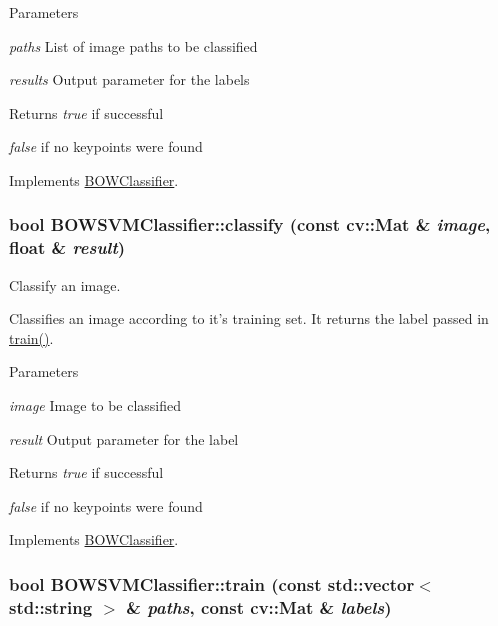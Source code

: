 \begin{DoxyParams}{Parameters}
\item[{\em paths}]List of image paths to be classified \item[{\em results}]Output parameter for the labels \end{DoxyParams}
\begin{DoxyReturn}{Returns}
{\itshape true\/} if successful\par
 {\itshape false\/} if no keypoints were found 
\end{DoxyReturn}


Implements \hyperlink{classBOWClassifier_a0785d39115372051816210d8d2c0335e}{BOWClassifier}.

\hypertarget{classBOWSVMClassifier_afe93005b018993deb266193ff942554a}{
\subsubsection[{classify}]{\setlength{\rightskip}{0pt plus 5cm}bool BOWSVMClassifier::classify (const cv::Mat \& {\em image}, \/  float \& {\em result})}}
\label{classBOWSVMClassifier_afe93005b018993deb266193ff942554a}


Classify an image. 

Classifies an image according to it's training set. It returns the label passed in \hyperlink{classBOWSVMClassifier_a95f08ba073d32d733aa79ae52113c147}{train()}.


\begin{DoxyParams}{Parameters}
\item[{\em image}]Image to be classified \item[{\em result}]Output parameter for the label \end{DoxyParams}
\begin{DoxyReturn}{Returns}
{\itshape true\/} if successful\par
 {\itshape false\/} if no keypoints were found 
\end{DoxyReturn}


Implements \hyperlink{classBOWClassifier_a63bff22f5005e1b79d9c4cd5e7a57748}{BOWClassifier}.

\hypertarget{classBOWSVMClassifier_a95f08ba073d32d733aa79ae52113c147}{
\subsubsection[{train}]{\setlength{\rightskip}{0pt plus 5cm}bool BOWSVMClassifier::train (const std::vector$<$ std::string $>$ \& {\em paths}, \/  const cv::Mat \& {\em labels})}}
\label{classBOWSVMClassifier_a95f08ba073d32d733aa79ae52113c147}


